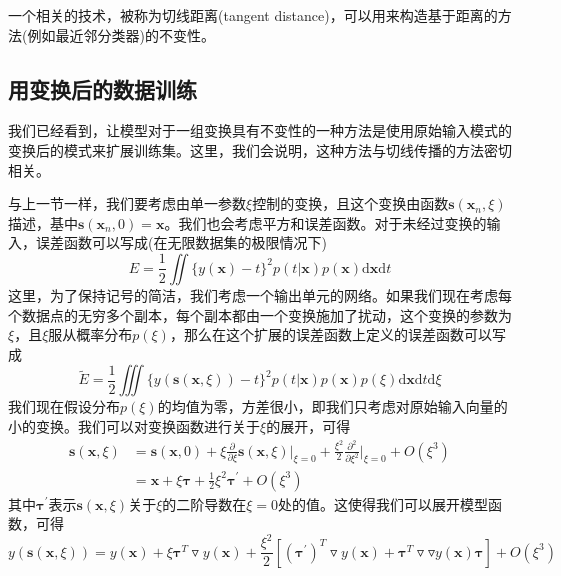 一个相关的技术，被称为切线距离(tangent distance)，可以用来构造基于距离的方法(例如最近邻分类器)的不变性。
\subsection*{用变换后的数据训练}
我们已经看到，让模型对于一组变换具有不变性的一种方法是使用原始输入模式的变换后的模式来扩展训练集。这里，我们会说明，这种方法与切线传播的方法密切相关。

与上一节一样，我们要考虑由单一参数$\xi$控制的变换，且这个变换由函数$\boldsymbol{s}(\boldsymbol{x}_n,\xi)$描述，基中$\boldsymbol{s}(\boldsymbol{x}_n,0)=\boldsymbol{x}$。我们也会考虑平方和误差函数。对于未经过变换的输入，误差函数可以写成(在无限数据集的极限情况下)
\begin{equation}
	E=\frac{1}{2}\iint \{y(\boldsymbol{x})-t \}^2p(t|\boldsymbol{x})p(\boldsymbol{x})\mathrm{d}\boldsymbol{x}\mathrm{d}t
\end{equation}
这里，为了保持记号的简洁，我们考虑一个输出单元的网络。如果我们现在考虑每个数据点的无穷多个副本，每个副本都由一个变换施加了扰动，这个变换的参数为$\xi$，且$\xi$服从概率分布$p(\xi)$，那么在这个扩展的误差函数上定义的误差函数可以写成
\begin{equation}
\label{5130}
	\tilde{E}=\frac{1}{2}\iiint \{y(\boldsymbol{s}(\boldsymbol{x},\xi))-t \}^2p(t|\boldsymbol{x})p(\boldsymbol{x})p(\xi)\mathrm{d}\boldsymbol{x}\mathrm{d}t\mathrm{d}\xi
\end{equation}
我们现在假设分布$p(\xi)$的均值为零，方差很小，即我们只考虑对原始输入向量的小的变换。我们可以对变换函数进行关于$\xi$的展开，可得
\begin{equation}
	\begin{aligned}
		\boldsymbol{s}(\boldsymbol{x},\xi)&=\boldsymbol{s}(\boldsymbol{x},0)+\xi \frac{\partial }{\partial \xi}\boldsymbol{s}(\boldsymbol{x},\xi)\Bigg|_{\xi=0}+\frac{\xi^2}{2}\frac{\partial^2}{\partial \xi^2}\Bigg|_{\xi=0}+O(\xi^3)\\
		&=\boldsymbol{x}+\xi\boldsymbol{\tau}+\frac{1}{2}\xi^2\boldsymbol{\tau}^{'}+O(\xi^3)
	\end{aligned}
\end{equation}
其中$\boldsymbol{\tau}^{'}$表示$\boldsymbol{s}(\boldsymbol{x},\xi)$关于$\xi$的二阶导数在$\xi=0$处的值。这使得我们可以展开模型函数，可得 
\begin{equation}
	y(\boldsymbol{s}(\boldsymbol{x},\xi))=y(\boldsymbol{x})+\xi\boldsymbol{\tau}^T\triangledown y(\boldsymbol{x})+\frac{\xi^2}{2}\left[(\boldsymbol{\tau}^{'})^T\triangledown y(\boldsymbol{x})+\boldsymbol{\tau}^T\triangledown\triangledown y(\boldsymbol{x})\boldsymbol{\tau} \right]+O(\xi^3)
\end{equation}
